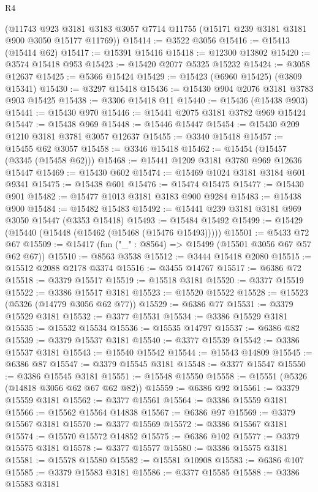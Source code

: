 \begin{lexlean}{R4}
\begin{coremodule}
    (@11743 @923 @3181 @3183 @3057 @7714 @11755 (@15171 @239 @3181 @3181 @900 @3050 @15177 @11769))
@15414 := @3522 @3056
@15416 := @15413 (@15414 @62)
@15417 := @15391 @15416
@15418 := @12300 @13802
@15420 := @3574 @15418 @953
@15423 := @15420 @2077 @5325 @15232
@15424 := @3058 @12637
@15425 := @5366 @15424
@15429 := @15423 (@6960 @15425) (@3809 @15341)
@15430 := @3297 @15418
@15436 := @15430 @904 @2076 @3181 @3783 @903 @15425
@15438 := @3306 @15418 @11
@15440 := @15436 (@15438 @903)
@15441 := @15430 @970
@15446 := @15441 @2075 @3181 @3782 @969 @15424
@15447 := @15438 @969
@15448 := @15446 @15447
@15454 := @15430 @209 @1210 @3181 @3781 @3057 @12637
@15455 := @3340 @15418
@15457 := @15455 @62 @3057
@15458 := @3346 @15418
@15462 := @15454 (@15457 (@3345 (@15458 @62)))
@15468 := @15441 @1209 @3181 @3780 @969 @12636 @15447
@15469 := @15430 @602
@15474 := @15469 @1024 @3181 @3184 @601 @9341
@15475 := @15438 @601
@15476 := @15474 @15475
@15477 := @15430 @901
@15482 := @15477 @1013 @3181 @3183 @900 @9284
@15483 := @15438 @900
@15484 := @15482 @15483
@15492 := @15441 @239 @3181 @3181 @969 @3050 @15447 (@3353 @15418)
@15493 := @15484 @15492
@15499 := @15429 (@15440 (@15448 (@15462 (@15468 (@15476 @15493)))))
@15501 := @5433 @72 @67
@15509 := @15417 (fun ("_" : @8564) => @15499 (@15501 @3056 @67 @57 @62 @67))
@15510 := @8563 @3538
@15512 := @3444 @15418 @2080
@15515 := @15512 @2088 @2178 @3374
@15516 := @3455 @14767
@15517 := @6386 @72
@15518 := @3379 @15517
@15519 := @15518 @3181
@15520 := @3377 @15519
@15522 := @3386 @15517 @3181
@15523 := @15520 @15522
@15528 := @15523 (@5326 (@14779 @3056 @62 @77))
@15529 := @6386 @77
@15531 := @3379 @15529 @3181
@15532 := @3377 @15531
@15534 := @3386 @15529 @3181
@15535 := @15532 @15534
@15536 := @15535 @14797
@15537 := @6386 @82
@15539 := @3379 @15537 @3181
@15540 := @3377 @15539
@15542 := @3386 @15537 @3181
@15543 := @15540 @15542
@15544 := @15543 @14809
@15545 := @6386 @87
@15547 := @3379 @15545 @3181
@15548 := @3377 @15547
@15550 := @3386 @15545 @3181
@15551 := @15548 @15550
@15558 := @15551 (@5326 (@14818 @3056 @62 @67 @62 @82))
@15559 := @6386 @92
@15561 := @3379 @15559 @3181
@15562 := @3377 @15561
@15564 := @3386 @15559 @3181
@15566 := @15562 @15564 @14838
@15567 := @6386 @97
@15569 := @3379 @15567 @3181
@15570 := @3377 @15569
@15572 := @3386 @15567 @3181
@15574 := @15570 @15572 @14852
@15575 := @6386 @102
@15577 := @3379 @15575 @3181
@15578 := @3377 @15577
@15580 := @3386 @15575 @3181
@15581 := @15578 @15580
@15582 := @15581 @10908
@15583 := @6386 @107
@15585 := @3379 @15583 @3181
@15586 := @3377 @15585
@15588 := @3386 @15583 @3181

\end{coremodule}
\end{lexlean}

